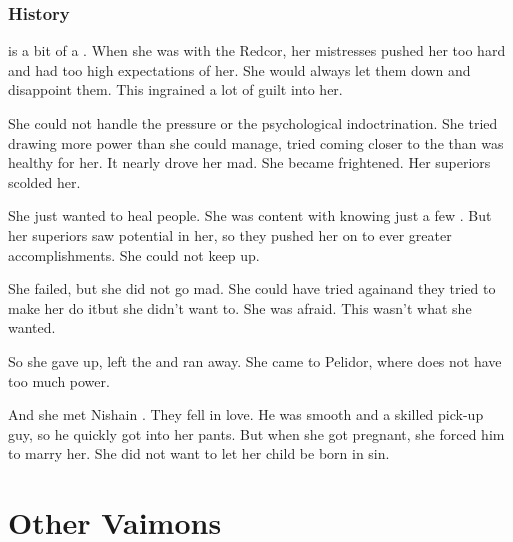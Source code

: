 \subsection{History}
\Roanne{} is a bit of a . 
When she was with the Redcor, her mistresses pushed her too hard and had too high expectations of her. 
She would always let them down and disappoint them. 
This ingrained a lot of guilt into her. 

She could not handle the pressure or the psychological indoctrination. 
She tried drawing more \iquin{} power than she could manage, tried coming closer to the \sephiroth{} than was healthy for her. 
It nearly drove her mad. 
She became frightened. 
Her superiors scolded her. 

She just wanted to heal people. 
She was content with knowing just a few \sephiroth. 
But her superiors saw potential in her, so they pushed her on to ever greater accomplishments. 
She could not keep up. 

She failed, but she did not go mad. 
She could have tried again\dash and they tried to make her do it\dash but she didn't want to.
She was afraid. 
This wasn't what she wanted. 

So she gave up, left the \vclan and ran away. 
She came to Pelidor, where \ClanRedcor does not have too much power. 

And she met Nishain \Shachar. 
They fell in love. 
He was smooth and a skilled pick-up guy, so he quickly got into her pants. 
But when she got pregnant, she forced him to marry her. 
She did not want to let her child be born in sin. 












































\chapter{Other Vaimons}















